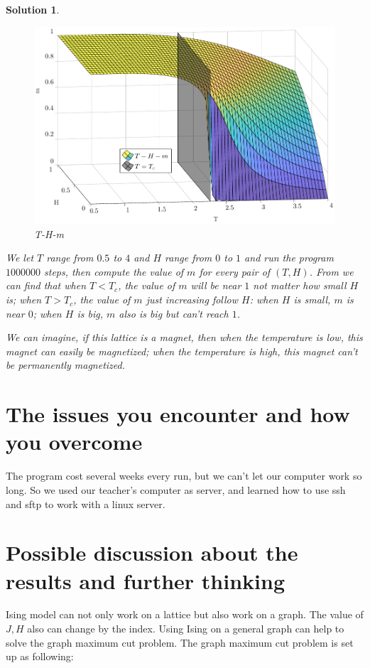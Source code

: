 \documentclass[11pt,openany]{book}              %
\newtheorem{solution}{Solution}
\begin{document}
\begin{solution}
	\begin{figure}
		\centering
		\includegraphics[width=\linewidth]{figs/THM.pdf}
		\caption{T-H-m}
		\label{fig:THM}
	\end{figure}
	We let \(T\) range from \(0.5\) to \(4\) and \(H\) range from \(0\) to \(1\) and run the program \(1000000\) steps, then compute the value of \(m\) for every pair of \(( T,H)\).
	From  we can find that when \(T<T_c\), the value of \(m\) will be near \(1\) not matter how small \(H\) is;
	when \(T>T_c\), the value of \(m\) just increasing follow \(H\):
	when \(H\) is small, \(m\) is near \(0\);
	when \(H\) is big, \(m\) also is big but can't reach \(1\).

	We can imagine, if this lattice is a magnet, then when the temperature is low, this magnet can easily be magnetized; when the temperature is high, this magnet can't be permanently magnetized.
\end{solution}

\section{The issues you encounter and how you overcome}
The program cost several weeks every run, but we can't let our computer work so long.
So we used our teacher's computer as server, and learned how to use ssh and sftp to work with a linux server.
\section{Possible discussion about the results and further thinking}
Ising model can not only work on a lattice but also work on a graph.
The value of \(J,H\) also can change by the index.
Using Ising on a general graph can help to solve the graph maximum cut problem.
The graph maximum cut problem is set up as following:
\end{document}
